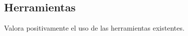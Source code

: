 \subsection{Herramientas}

Valora positivamente el uso de las herramientas existentes.















% 
